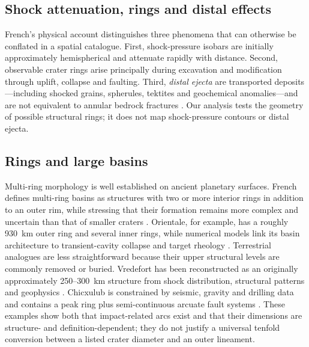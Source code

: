 \documentclass[11pt]{article}
\begin{document}
\subsection{Shock attenuation, rings and distal effects}
French's physical account distinguishes three phenomena that can otherwise be conflated in a spatial catalogue. First, shock-pressure isobars are initially approximately hemispherical and attenuate rapidly with distance. Second, observable crater rings arise principally during excavation and modification through uplift, collapse and faulting. Third, \emph{distal ejecta} are transported deposits---including shocked grains, spherules, tektites and geochemical anomalies---and are not equivalent to annular bedrock fractures \cite[pp.~18--29, 78, 87--90]{French1998}. Our analysis tests the geometry of possible structural rings; it does not map shock-pressure contours or distal ejecta.

\subsection{Rings and large basins}
Multi-ring morphology is well established on ancient planetary surfaces. French defines multi-ring basins as structures with two or more interior rings in addition to an outer rim, while stressing that their formation remains more complex and uncertain than that of smaller craters \cite[pp.~27--28]{French1998}. Orientale, for example, has a roughly 930~km outer ring and several inner rings, while numerical models link its basin architecture to transient-cavity collapse and target rheology \cite{French1998,Potter2013}. Terrestrial analogues are less straightforward because their upper structural levels are commonly removed or buried. Vredefort has been reconstructed as an originally approximately 250--300~km structure from shock distribution, structural patterns and geophysics \cite{Therriault1997,ReimoldKoeberl2014}. Chicxulub is constrained by seismic, gravity and drilling data and contains a peak ring plus semi-continuous arcuate fault systems \cite{Gulick2013}. These examples show both that impact-related arcs exist and that their dimensions are structure- and definition-dependent; they do not justify a universal tenfold conversion between a listed crater diameter and an outer lineament.
\end{document}
